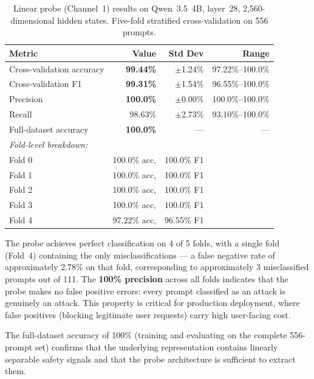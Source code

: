 \documentclass[11pt]{article}
\begin{document}
\begin{table}[H]
\centering
\caption{Linear probe (Channel~1) results on Qwen~3.5~4B, layer~28, 2,560-dimensional hidden states. Five-fold stratified cross-validation on 556 prompts.}
\label{tab:probe_results}
\begin{tabular}{lrrr}
\toprule
\textbf{Metric} & \textbf{Value} & \textbf{Std Dev} & \textbf{Range} \\
\midrule
Cross-validation accuracy & \textbf{99.44\%} & $\pm$1.24\% & 97.22\%--100.0\% \\
Cross-validation F1       & \textbf{99.31\%} & $\pm$1.54\% & 96.55\%--100.0\% \\
Precision                 & \textbf{100.0\%} & $\pm$0.00\% & 100.0\%--100.0\% \\
Recall                    & 98.63\%           & $\pm$2.73\% & 93.10\%--100.0\% \\
Full-dataset accuracy     & \textbf{100.0\%} & —           & — \\
\midrule
\multicolumn{4}{l}{\small \textit{Fold-level breakdown:}} \\
\quad Fold 0 & 100.0\% acc, & 100.0\% F1 & \\
\quad Fold 1 & 100.0\% acc, & 100.0\% F1 & \\
\quad Fold 2 & 100.0\% acc, & 100.0\% F1 & \\
\quad Fold 3 & 100.0\% acc, & 100.0\% F1 & \\
\quad Fold 4 & 97.22\% acc, & 96.55\% F1 & \\
\bottomrule
\end{tabular}
\end{table}

The probe achieves perfect classification on 4 of 5 folds, with a single fold (Fold~4) containing the only misclassifications — a false negative rate of approximately 2.78\% on that fold, corresponding to approximately 3 misclassified prompts out of 111. The \textbf{100\% precision} across all folds indicates that the probe makes no false positive errors: every prompt classified as an attack is genuinely an attack. This property is critical for production deployment, where false positives (blocking legitimate user requests) carry high user-facing cost.

The full-dataset accuracy of 100\% (training and evaluating on the complete 556-prompt set) confirms that the underlying representation contains linearly separable safety signals and that the probe architecture is sufficient to extract them.
\end{document}
